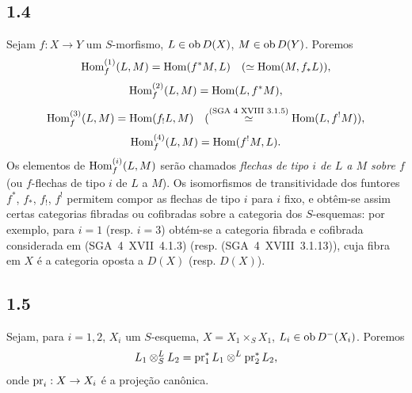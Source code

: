 \subsection*{1.4}
Sejam $f:X\to Y$ um $S$-morfismo, $L\in\operatorname{ob} D(X)$, $M\in\operatorname{ob} D(Y)$. Poremos
\[
\operatorname{Hom}_f^{(1)}(L,M)=\operatorname{Hom}(f^{*}M,L)\quad (\simeq \operatorname{Hom}(M,f_{*}L)),
\]
\[
\operatorname{Hom}_f^{(2)}(L,M)=\operatorname{Hom}(L,f^{*}M),
\]
\[
\operatorname{Hom}_f^{(3)}(L,M)=\operatorname{Hom}(f_{!}L,M)\quad (\overset{\text{(SGA~4~XVIII~3.1.5)}}{\simeq} \operatorname{Hom}(L,f^{!}M)),
\]
\[
\operatorname{Hom}_f^{(4)}(L,M)=\operatorname{Hom}(f^{!}M,L).
\]
Os elementos de $\operatorname{Hom}_f^{(i)}(L,M)$ serão chamados \emph{flechas de tipo $i$ de $L$ a $M$ sobre $f$} (ou $f$-flechas de tipo $i$ de $L$ a $M$). Os isomorfismos de transitividade dos funtores $f^{*}$, $f_{*}$, $f_{!}$, $f^{!}$ permitem compor as flechas de tipo $i$ para $i$ fixo, e obtêm-se assim certas categorias fibradas ou cofibradas sobre a categoria dos $S$-esquemas: por exemplo, para $i=1$ (resp. $i=3$) obtém-se a categoria fibrada e cofibrada considerada em (SGA~4~XVII~4.1.3) (resp. (SGA~4~XVIII~3.1.13)), cuja fibra em $X$ é a categoria oposta a $D(X)$ (resp. $D(X)$).

\subsection*{1.5}
Sejam, para $i=1,2$, $X_i$ um $S$-esquema, $X=X_1\times_S X_1$, $L_i\in\operatorname{ob} D^{-}(X_i)$. Poremos
\[
L_1\otimes^{L}_{S}L_2=\operatorname{pr}_1^{*}L_1\otimes^{L}\operatorname{pr}_2^{*}L_2,
\]
onde $\operatorname{pr}_i:X\to X_i$ é a projeção canônica.

